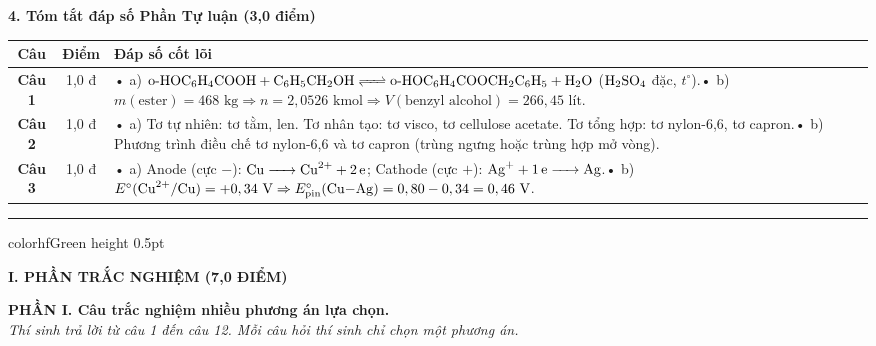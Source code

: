 \documentclass[11pt,a4paper]{article}
\begin{document}
\vspace{2pt}
\noindent
\textbf{\color{mainGreen}4. Tóm tắt đáp số Phần Tự luận (3,0 điểm)}
\begin{center}
\renewcommand{\arraystretch}{1.2}
\begin{tabular}{|c|c|p{11.5cm}|}
\hline
\rowcolor{tableGreen}
\textbf{Câu} & \textbf{Điểm} & \textbf{Đáp số cốt lõi} \\
\hline
\textbf{Câu 1} & 1,0 đ & • a) $\ce{o-HOC6H4COOH + C6H5CH2OH <=> o-HOC6H4COOCH2C6H5 + H2O}$ ($\ce{H2SO4}$ đặc, $t^\circ$).\newline • b) $m(\text{ester}) = 468\text{ kg} \Rightarrow n = 2,0526\text{ kmol} \Rightarrow V(\text{benzyl alcohol}) = 266,45\text{ lít}$. \\
\hline
\textbf{Câu 2} & 1,0 đ & • a) Tơ tự nhiên: tơ tằm, len. Tơ nhân tạo: tơ visco, tơ cellulose acetate. Tơ tổng hợp: tơ nylon-6,6, tơ capron.\newline • b) Phương trình điều chế tơ nylon-6,6 và tơ capron (trùng ngưng hoặc trùng hợp mở vòng). \\
\hline
\textbf{Câu 3} & 1,0 đ & • a) Anode (cực $-$): $\ce{Cu -> Cu^2+ + 2e}$; Cathode (cực $+$): $\ce{Ag+ + 1e -> Ag}$.\newline • b) $E^\circ(\ce{Cu^2+/Cu}) = +0,34\text{ V} \Rightarrow E^\circ_{\text{pin}}(\ce{Cu-Ag}) = 0,80 - 0,34 = 0,46\text{ V}$. \\
\hline
\end{tabular}
\end{center}

\vspace{4pt}
\hrule color{hfGreen} height 0.5pt

\vspace{4pt}
\noindent
{\color{mainGreen}\textbf{\Large I. PHẦN TRẮC NGHIỆM (7,0 ĐIỂM)}}

\vspace{3pt}
\noindent
{\color{mainGreen}\textbf{\large PHẦN I. Câu trắc nghiệm nhiều phương án lựa chọn.}}\\
\textit{\small Thí sinh trả lời từ câu 1 đến câu 12. Mỗi câu hỏi thí sinh chỉ chọn một phương án.}
\vspace{2pt}
\end{document}

